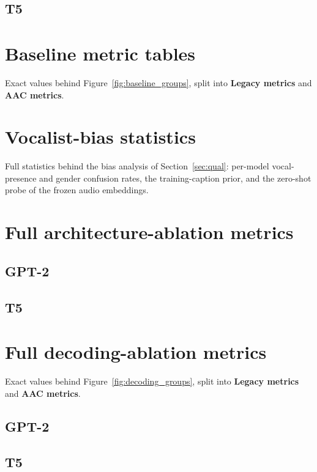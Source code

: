 \documentclass[9pt]{report}
\begin{document}
\FloatBarrier
\subsection*{T5}



\FloatBarrier
\section{Baseline metric tables}
Exact values behind Figure~\ref{fig:baseline_groups}, split into
\textbf{Legacy metrics} and \textbf{AAC metrics}.




\FloatBarrier
\section{Vocalist-bias statistics}
Full statistics behind the bias analysis of Section~\ref{sec:qual}: per-model
vocal-presence and gender confusion rates, the training-caption prior, and the
zero-shot probe of the frozen audio embeddings.




\FloatBarrier
\section{Full architecture-ablation metrics}

\subsection*{GPT-2}



\FloatBarrier
\subsection*{T5}



\FloatBarrier
\section{Full decoding-ablation metrics}
Exact values behind Figure~\ref{fig:decoding_groups}, split into
\textbf{Legacy metrics} and \textbf{AAC metrics}.

\subsection*{GPT-2}



\FloatBarrier
\subsection*{T5}


\end{document}
